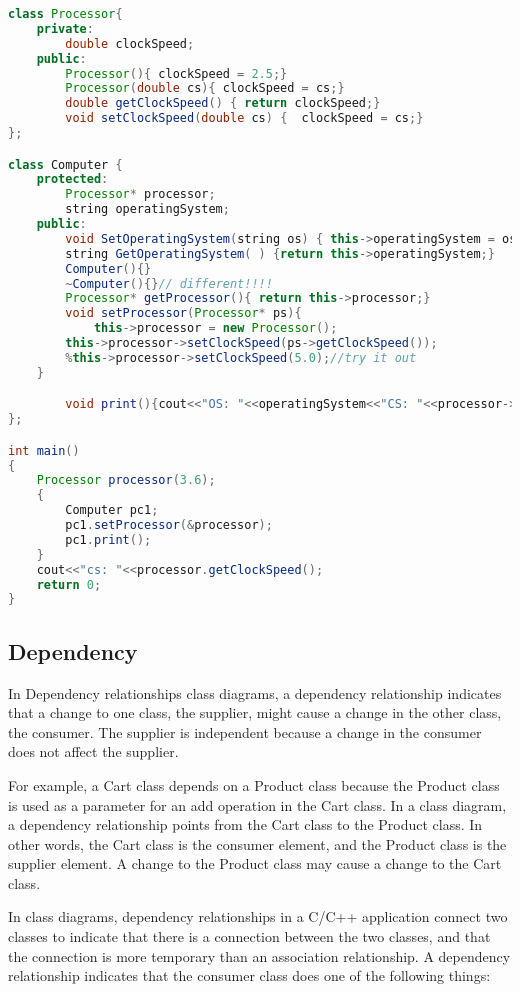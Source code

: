 \documentclass{book}
\begin{document}
\begin{lstlisting}[caption={bidirectional association example}, language=Java]
class Processor{
    private:
        double clockSpeed;
    public:
        Processor(){ clockSpeed = 2.5;}
        Processor(double cs){ clockSpeed = cs;}
        double getClockSpeed() { return clockSpeed;}
        void setClockSpeed(double cs) {  clockSpeed = cs;}
};

class Computer {
    protected:
        Processor* processor;
        string operatingSystem;
    public:
        void SetOperatingSystem(string os) { this->operatingSystem = os;}
        string GetOperatingSystem( ) {return this->operatingSystem;}
        Computer(){}
        ~Computer(){}// different!!!!
        Processor* getProcessor(){ return this->processor;}
        void setProcessor(Processor* ps){
            this->processor = new Processor();
        this->processor->setClockSpeed(ps->getClockSpeed());
        %this->processor->setClockSpeed(5.0);//try it out
    }

        void print(){cout<<"OS: "<<operatingSystem<<"CS: "<<processor->getClockSpeed(); }
};

int main()
{
    Processor processor(3.6);
    {
        Computer pc1;
        pc1.setProcessor(&processor);
        pc1.print();
    }
    cout<<"cs: "<<processor.getClockSpeed();
    return 0;
}
\end{lstlisting}



\subsection{Dependency}

In Dependency relationships class diagrams, a dependency relationship indicates that a change to one class, the supplier, might cause a change in the other class, the consumer.
The supplier is independent because a change in the consumer does not affect the supplier.

For example, a Cart class depends on a Product class because the Product class is used as a parameter for an add operation in the Cart class.
In a class diagram, a dependency relationship points from the Cart class to the Product class. In other words, the Cart class is the consumer element,
and the Product class is the supplier element. A change to the Product class may cause a change to the Cart class.

In class diagrams, dependency relationships in a C/C++ application connect two classes to indicate that there is a connection between the two classes,
and that the connection is more temporary than an association relationship. A dependency relationship indicates that the consumer class does one of the following things:
\end{document}

